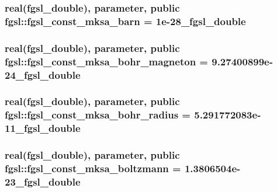 \subsubsection[{fgsl\+\_\+const\+\_\+mksa\+\_\+barn}]{\setlength{\rightskip}{0pt plus 5cm}real({\bf fgsl\+\_\+double}), parameter, public fgsl\+::fgsl\+\_\+const\+\_\+mksa\+\_\+barn = 1e-\/28\+\_\+fgsl\+\_\+double}\label{namespacefgsl_a859c8ea83a5175d31bc4240282c2b0b4}
\hypertarget{namespacefgsl_afa92cd1a7ffe8a0106c3ae29720b0f84}{}
\subsubsection[{fgsl\+\_\+const\+\_\+mksa\+\_\+bohr\+\_\+magneton}]{\setlength{\rightskip}{0pt plus 5cm}real({\bf fgsl\+\_\+double}), parameter, public fgsl\+::fgsl\+\_\+const\+\_\+mksa\+\_\+bohr\+\_\+magneton = 9.\+27400899e-\/24\+\_\+fgsl\+\_\+double}\label{namespacefgsl_afa92cd1a7ffe8a0106c3ae29720b0f84}
\hypertarget{namespacefgsl_a52a0f9900118e47b537d0ee98ba88780}{}
\subsubsection[{fgsl\+\_\+const\+\_\+mksa\+\_\+bohr\+\_\+radius}]{\setlength{\rightskip}{0pt plus 5cm}real({\bf fgsl\+\_\+double}), parameter, public fgsl\+::fgsl\+\_\+const\+\_\+mksa\+\_\+bohr\+\_\+radius = 5.\+291772083e-\/11\+\_\+fgsl\+\_\+double}\label{namespacefgsl_a52a0f9900118e47b537d0ee98ba88780}
\hypertarget{namespacefgsl_aee3fe8b4260b1d34436e9f66707b773e}{}
\subsubsection[{fgsl\+\_\+const\+\_\+mksa\+\_\+boltzmann}]{\setlength{\rightskip}{0pt plus 5cm}real({\bf fgsl\+\_\+double}), parameter, public fgsl\+::fgsl\+\_\+const\+\_\+mksa\+\_\+boltzmann = 1.\+3806504e-\/23\+\_\+fgsl\+\_\+double}\label{namespacefgsl_aee3fe8b4260b1d34436e9f66707b773e}
\hypertarget{namespacefgsl_a868742553429b50b469d7d21a481cc66}{}
